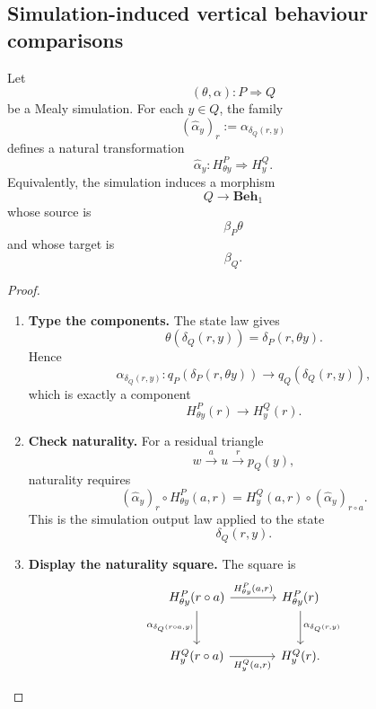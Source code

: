 \subsection{Simulation-induced vertical behaviour comparisons}
\label{subsec:simulation-induced-behaviour-comparisons}

\begin{theorem}
\label{thm:simulation-induces-behaviour-comparison}
    Let
    \[
        (\theta,\alpha):P\Rightarrow Q
    \]
    be a Mealy simulation. For each \(y\in Q\), the family
    \[
        (\widehat\alpha_y)_r:=\alpha_{\delta_Q(r,y)}
    \]
    defines a natural transformation
    \[
        \widehat\alpha_y:
        H^P_{\theta y}\Rightarrow H^Q_y.
    \]
    Equivalently, the simulation induces a morphism
    \[
        Q\to\mathbf{Beh}_1
    \]
    whose source is
    \[
        \beta_P\theta
    \]
    and whose target is
    \[
        \beta_Q.
    \]
\end{theorem}
\begin{proof}
    \leavevmode
    \begin{enumerate}
        \item \textbf{Type the components.} The state law gives
        \[
            \theta(\delta_Q(r,y))=\delta_P(r,\theta y).
        \]
        Hence
        \[
            \alpha_{\delta_Q(r,y)}
            :
            q_P(\delta_P(r,\theta y))
            \to
            q_Q(\delta_Q(r,y)),
        \]
        which is exactly a component
        \[
            H^P_{\theta y}(r)\to H^Q_y(r).
        \]

        \item \textbf{Check naturality.} For a residual triangle
        \[
            w\xrightarrow{a}u\xrightarrow{r}p_Q(y),
        \]
        naturality requires
        \[
            (\widehat\alpha_y)_r\circ H^P_{\theta y}(a,r)
            =
            H^Q_y(a,r)\circ(\widehat\alpha_y)_{r\circ a}.
        \]
        This is the simulation output law applied to the state
        \[
            \delta_Q(r,y).
        \]

        \item \textbf{Display the naturality square.} The square is
        \[
            \begin{tikzcd}[column sep=large, row sep=large]
                    H^P_{\theta y}(r\circ a)
                        \arrow[r, "{H^P_{\theta y}(a,r)}"]
                        \arrow[d, "{\alpha_{\delta_Q(r\circ a,y)}}"']
                &
                    H^P_{\theta y}(r)
                        \arrow[d, "{\alpha_{\delta_Q(r,y)}}"]
                \\
                    H^Q_y(r\circ a)
                        \arrow[r, "{H^Q_y(a,r)}"']
                &
                    H^Q_y(r).
            \end{tikzcd}
        \]
    \end{enumerate}
\end{proof}

